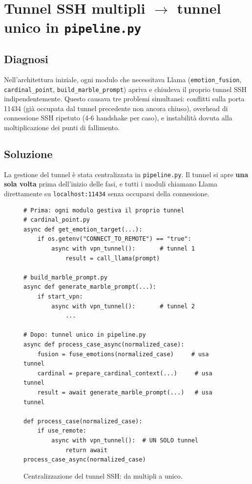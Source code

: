 \documentclass[11pt]{report}
\begin{document}
 
\section{Tunnel SSH multipli $\rightarrow$ tunnel unico in \texttt{pipeline.py}}
 
\subsection*{Diagnosi}
Nell'architettura iniziale, ogni modulo che necessitava Llama (\texttt{emotion\_fusion}, \texttt{cardinal\_point}, \texttt{build\_marble\_prompt}) apriva e chiudeva il proprio tunnel SSH indipendentemente. Questo causava tre problemi simultanei: conflitti sulla porta 11434 (già occupata dal tunnel precedente non ancora chiuso), overhead di connessione SSH ripetuto (4-6 handshake per caso), e instabilità dovuta alla moltiplicazione dei punti di fallimento.
 
\subsection*{Soluzione}
La gestione del tunnel è stata centralizzata in \texttt{pipeline.py}. Il tunnel si apre \textbf{una sola volta} prima dell'inizio delle fasi, e tutti i moduli chiamano Llama direttamente su \texttt{localhost:11434} senza occuparsi della connessione.
 
\begin{figure}[H]
\begin{verbatim}
# Prima: ogni modulo gestiva il proprio tunnel
# cardinal_point.py
async def get_emotion_target(...):
    if os.getenv("CONNECT_TO_REMOTE") == "true":
        async with vpn_tunnel():       # tunnel 1
            result = call_llama(prompt)
 
# build_marble_prompt.py  
async def generate_marble_prompt(...):
    if start_vpn:
        async with vpn_tunnel():       # tunnel 2
            ...
 
# Dopo: tunnel unico in pipeline.py
async def process_case_async(normalized_case):
    fusion = fuse_emotions(normalized_case)     # usa tunnel
    cardinal = prepare_cardinal_context(...)     # usa tunnel
    result = await generate_marble_prompt(...)   # usa tunnel
 
def process_case(normalized_case):
    if use_remote:
        async with vpn_tunnel():  # UN SOLO tunnel
            return await process_case_async(normalized_case)
\end{verbatim}
\caption{Centralizzazione del tunnel SSH: da multipli a unico.}
\end{figure}
 
\end{document}
